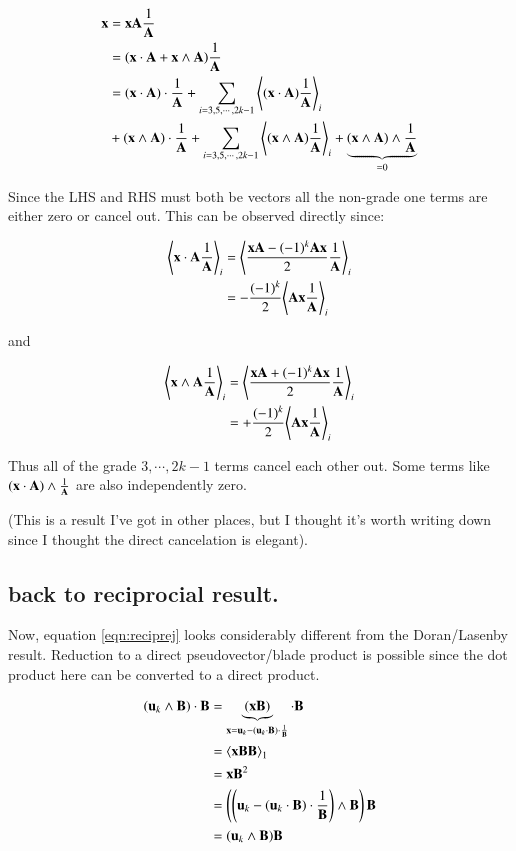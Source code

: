 \documentclass{article}      %
\newcommand{\gpgrade}[2] {{\left\langle{{#1}}\right\rangle}_{#2}}
\newcommand{\gpgradeone}[1] {{\left\langle{{#1}}\right\rangle}_{1}}
\begin{document}
\begin{align*}
\Bx 
&= \Bx \BA \inv{\BA} \\
&= (\Bx \cdot \BA + \Bx \wedge \BA) \inv{\BA} \\
&= 
(\Bx \cdot \BA) \cdot \inv{\BA}
+ \sum_{i=3,5,\cdots,2k-1} \gpgrade{(\Bx \cdot \BA) \inv{\BA}}{i} \\
&+ 
(\Bx \wedge \BA) \cdot \inv{\BA}
+ \sum_{i=3,5,\cdots,2k-1} \gpgrade{(\Bx \wedge \BA) \inv{\BA}}{i} 
+ \underbrace{(\Bx \wedge \BA) \wedge \inv{\BA}}_{=0}
\end{align*}

Since the LHS and RHS must both be vectors all the non-grade one terms
are either zero or cancel out.  This can be observed directly since:

\begin{align*}
\gpgrade{\Bx \cdot \BA \inv{\BA}}{i}
&= \gpgrade{ \frac{\Bx \BA - (-1)^{k}\BA\Bx}{2}\inv{\BA} }{i}  \\
&= -\frac{(-1)^{k}}{2} \gpgrade{ \BA\Bx \inv{\BA} }{i}  \\
\end{align*}

and

\begin{align*}
\gpgrade{\Bx \wedge \BA \inv{\BA}}{i} 
&= \gpgrade{ \frac{\Bx \BA + (-1)^{k}\BA\Bx}{2}\inv{\BA} }{i}  \\
&= +\frac{(-1)^{k}}{2} \gpgrade{ \BA\Bx \inv{\BA} }{i}  \\
\end{align*}

Thus all of the grade $3, \cdots ,2k-1$ terms cancel each other out.  Some terms
like $(\mathbf{x} \cdot \mathbf{A}) \wedge \frac{1}{\mathbf{A}}$ are also independently zero.

(This is a result I've got in other places, but I thought it's worth
 writing down since I thought the direct cancelation is elegant).

\subsection{ back to reciprocial result. }

Now, 
equation \ref{eqn:reciprej}
looks considerably different from the Doran/Lasenby result.
Reduction to a direct pseudovector/blade product is possible since the
dot product here can be converted to a direct product.

\begin{align*}
(\Bu_k \wedge \BB) \cdot \BB
&= 
\underbrace{(\Bx \BB)}_{\Bx = \Bu_k - (\Bu_k \cdot \BB) \cdot \inv{\BB}}
\cdot \BB \\
&= \gpgradeone{
\Bx\BB \BB
} \\
&= \Bx \BB^2 \\
&= \left(\left(\Bu_k - (\Bu_k \cdot \BB) \cdot \inv{\BB}\right) \wedge \BB\right) \BB \\
&= (\Bu_k \wedge \BB) \BB \\
\end{align*}
\end{document}
